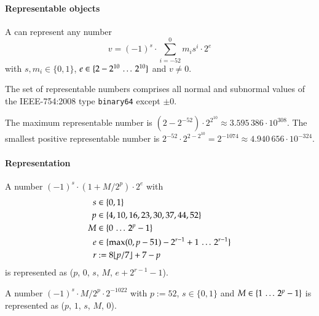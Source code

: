 \paragraph{Representable objects}

A \DborBinaryRationalValue{} can represent any number
\begin{equation}
    v = (-1)^s \cdot \sum_{i = -52}^0 m_i s^i \cdot 2^e
\end{equation}
with $s, m_i \in \{0, 1\}$, $e \in \{2 - 2^{10} \,\ldots\, 2^{10}\}$ and $v \ne 0$.

The set of representable numbers comprises all normal and subnormal values of the IEEE-754:2008 type
\texttt{binary64} except $\pm 0$.

\smallskip
The maximum representable number is $(2 - 2^{-52}) \cdot 2^{2^{10}} \approx 3.595\,386 \cdot 10^{308}$.
The smallest positive representable number is $2^{-52} \cdot 2^{2-2^{10}} = 2^{-1074}
\approx 4.940\,656 \cdot 10^{-324}$.

\paragraph{Representation}

A number $(-1)^s \cdot (1 + M/2^p) \cdot 2^e$ with
\begin{align*}
    s & \in \{0, 1\} \\
    p & \in \{4, 10, 16, 23, 30, 37, 44, 52\} \\
    M & \in \{0 \,\ldots\, 2^p - 1\} \\
    e & \in \{\max(0, p - 51) - 2^{r - 1} + 1 \,\ldots\, 2^{r - 1}\} \\
    r & := 8 \lfloor p / 7 \rfloor + 7 - p
\end{align*}%
is represented as
\DborBinaryRationalToken*($p$, $0$, $s$, $M$, $e + 2^{r - 1} - 1$).

A number $(-1)^s \cdot M/2^p \cdot 2^{-1022}$ with $p := 52$, $s \in \{0, 1\}$ and
$M \in \{1 \,\ldots\, 2^p - 1\}$ is represented as \DborBinaryRationalToken*($p$, $1$, $s$, $M$, $0$).

